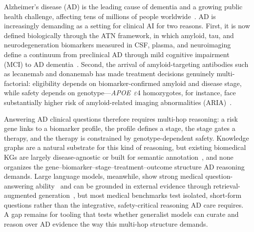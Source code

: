 \documentclass{article}
\begin{document}
Alzheimer's disease (AD) is the leading cause of dementia and a growing public health challenge, affecting tens of millions of people worldwide~\citep{livingston2020dementia}. AD is increasingly demanding as a setting for clinical AI for two reasons. First, it is now defined biologically through the ATN framework, in which amyloid, tau, and neurodegeneration biomarkers measured in CSF, plasma, and neuroimaging define a continuum from preclinical AD through mild cognitive impairment (MCI) to AD dementia~\citep{jack2018nia,sperling2011preclinical,albert2011mci,mckhann2011dementia}. Second, the arrival of amyloid-targeting antibodies such as lecanemab and donanemab has made treatment decisions genuinely multi-factorial: eligibility depends on biomarker-confirmed amyloid and disease stage, while safety depends on genotype---\textit{APOE}~$\varepsilon$4 homozygotes, for instance, face substantially higher risk of amyloid-related imaging abnormalities (ARIA)~\citep{vandyck2023lecanemab,sims2023donanemab,cummings2023auc}.

Answering AD clinical questions therefore requires multi-hop reasoning: a risk gene links to a biomarker profile, the profile defines a stage, the stage gates a therapy, and the therapy is constrained by genotype-dependent safety. Knowledge graphs are a natural substrate for this kind of reasoning, but existing biomedical KGs are largely disease-agnostic or built for semantic annotation~\citep{cui2025kghealth,chandak2023primekg}, and none organizes the gene--biomarker--stage--treatment--outcome structure AD reasoning demands. Large language models, meanwhile, show strong medical question-answering ability~\citep{singhal2023llm} and can be grounded in external evidence through retrieval-augmented generation~\citep{lewis2020rag,edge2024graphrag}, but most medical benchmarks test isolated, short-form questions rather than the integrative, safety-critical reasoning AD care requires. A gap remains for tooling that tests whether generalist models can curate and reason over AD evidence the way this multi-hop structure demands.
\end{document}
